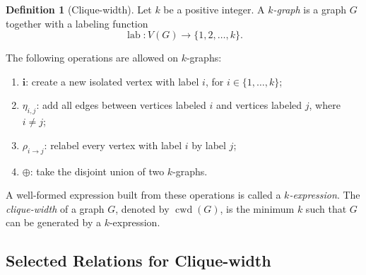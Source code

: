 \documentclass[10pt]{book}
\theoremstyle{definition}
\newtheorem{definition}[theorem]{Definition}
\begin{document}
\begin{definition}[Clique-width]
Let \(k\) be a positive integer.  
A \emph{\(k\)-graph} is a graph \(G\) together with a labeling function
\[
\operatorname{lab}:V(G)\to \{1,2,\dots,k\}.
\]

The following operations are allowed on \(k\)-graphs:
\begin{enumerate}
    \item \(\mathbf{i}\): create a new isolated vertex with label \(i\), for \(i\in\{1,\dots,k\}\);
    \item \(\eta_{i,j}\): add all edges between vertices labeled \(i\) and vertices labeled \(j\), where \(i\neq j\);
    \item \(\rho_{i\to j}\): relabel every vertex with label \(i\) by label \(j\);
    \item \(\oplus\): take the disjoint union of two \(k\)-graphs.
\end{enumerate}

A well-formed expression built from these operations is called a \emph{\(k\)-expression}.  
The \emph{clique-width} of a graph \(G\), denoted by \(\operatorname{cwd}(G)\), is the minimum \(k\) such that \(G\) can be generated by a \(k\)-expression.
\end{definition}

\subsection{Selected Relations for Clique-width}
\end{document}
